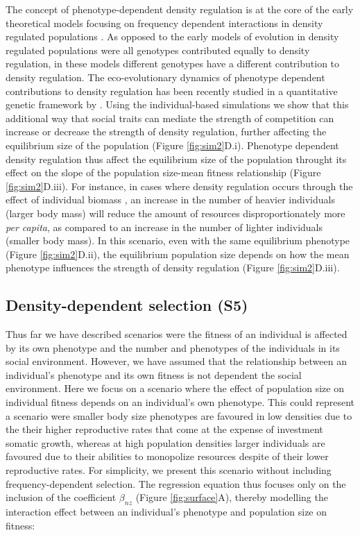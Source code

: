 \documentclass{article}
\begin{document}
The concept of phenotype-dependent density regulation is at the core of the early theoretical models focusing on frequency dependent interactions in density regulated populations \citep{Clarke1972, Anderson1983}. As opposed to the early models of evolution in density regulated populations were all genotypes contributed equally to density regulation, in these models different genotypes have a different contribution to density regulation. The eco-evolutionary dynamics of phenotype dependent contributions to density regulation has been recently studied in a quantitative genetic framework by \cite{Engen2020}. Using the individual-based simulations we show that this additional way that social traits can mediate the strength of competition can increase or decrease the strength of density regulation, further affecting the equilibrium size of the population (Figure \ref{fig:sim2}D.i). Phenotype dependent density regulation thus affect the equilibrium size of the population throught its effect on the slope of the population size-mean fitness relationship (Figure \ref{fig:sim2}D.iii). For instance, in cases where density regulation occurs through the effect of individual biomass \citep{Owen-Smith2002}, an increase in the number of heavier individuals (larger body mass) will reduce the amount of resources disproportionately more \textit{per capita}, as compared to an increase in the number of lighter individuals (smaller body mass). In this scenario, even with the same equilibrium phenotype (Figure \ref{fig:sim2}D.ii), the equilibrium population size depends on how the mean phenotype influences the strength of density regulation (Figure \ref{fig:sim2}D.iii). 

 \subsection{Density-dependent selection (S5)}
 Thus far we have described scenarios were the fitness of an individual is affected by its own phenotype and the number and phenotypes of the individuals in its social environment. However, we have assumed that the relationship between an individual's phenotype and its own fitness is not dependent the social environment. Here we focus on a scenario where the effect of population size on individual fitness depends on an individual's own phenotype. This could represent a scenario were smaller body size phenotypes are favoured in low densities due to the their higher reproductive rates that come at the expense of investment somatic growth, whereas at high population densities larger individuals are favoured due to their abilities to monopolize resources despite of their lower reproductive rates. For simplicity, we present this scenario without including frequency-dependent selection. The regression equation thus focuses only on the inclusion of the coefficient $\beta_{nz}$ (Figure \ref{fig:surface}A), thereby modelling the interaction effect between an individual's phenotype and population size on fitness:
\end{document}

